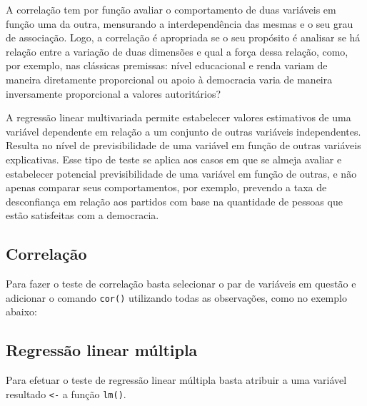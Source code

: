 \documentclass[
  10pt,
  brazil,
  a4paper,
  twoside, notitlepage, openright]{book}
\newenvironment{Shaded}{\begin{snugshade}}{\end{snugshade}}
\newcommand{\CommentTok}[1]{\textcolor[rgb]{0.56,0.35,0.01}{\textit{#1}}}
\newcommand{\DataTypeTok}[1]{\textcolor[rgb]{0.13,0.29,0.53}{#1}}
\newcommand{\KeywordTok}[1]{\textcolor[rgb]{0.13,0.29,0.53}{\textbf{#1}}}
\newcommand{\NormalTok}[1]{#1}
\newcommand{\OperatorTok}[1]{\textcolor[rgb]{0.81,0.36,0.00}{\textbf{#1}}}
\newcommand{\StringTok}[1]{\textcolor[rgb]{0.31,0.60,0.02}{#1}}
\begin{document}
A correlação tem por função avaliar o comportamento de duas variáveis em função uma da outra, mensurando a interdependência das mesmas e o seu grau de associação. Logo, a correlação é apropriada se o seu propósito é analisar se há relação entre a variação de duas dimensões e qual a força dessa relação, como, por exemplo, nas clássicas premissas: nível educacional e renda variam de maneira diretamente proporcional ou apoio à democracia varia de maneira inversamente proporcional a valores autoritários?

A regressão linear multivariada permite estabelecer valores estimativos de uma variável dependente em relação a um conjunto de outras variáveis independentes. Resulta no nível de previsibilidade de uma variável em função de outras variáveis explicativas. Esse tipo de teste se aplica aos casos em que se almeja avaliar e estabelecer potencial previsibilidade de uma variável em função de outras, e não apenas comparar seus comportamentos, por exemplo, prevendo a taxa de desconfiança em relação aos partidos com base na quantidade de pessoas que estão satisfeitas com a democracia.

\hypertarget{correlauxe7uxe3o}{%
\subsection{Correlação}\label{correlauxe7uxe3o}}

Para fazer o teste de correlação basta selecionar o par de variáveis em questão e adicionar o comando \texttt{cor()} utilizando todas as observações, como no exemplo abaixo:

\begin{Shaded}
\end{Shaded}

\hypertarget{regressuxe3o-linear-muxfaltipla}{%
\subsection{Regressão linear múltipla}\label{regressuxe3o-linear-muxfaltipla}}

Para efetuar o teste de regressão linear múltipla basta atribuir a uma variável resultado \texttt{\textless{}-} a função \texttt{lm()}.
\end{document}

